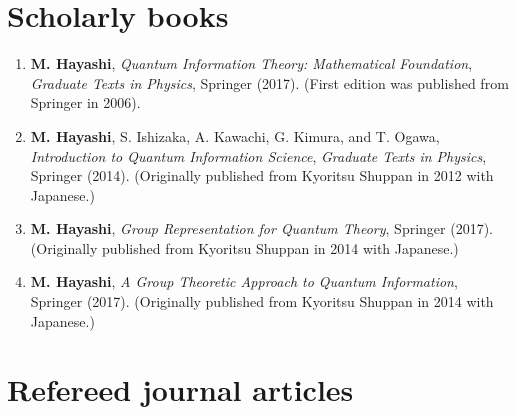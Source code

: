 \documentclass[a4paper,12pt,oneside]{article}
\begin{document}
\section{Scholarly books}
\begin{enumerate}

\item 
\textbf{M. Hayashi},
{\em Quantum Information Theory: Mathematical Foundation}, 
{\em Graduate Texts in Physics}, Springer (2017).
(First edition was published from Springer in 2006).

\item 
\textbf{M. Hayashi}, S. Ishizaka, A. Kawachi, G. Kimura, and T. Ogawa, 
{\em Introduction to Quantum Information Science}, 
{\em Graduate Texts in Physics}, Springer (2014).
(Originally published from Kyoritsu Shuppan in 2012 with Japanese.)
 
\item 
\textbf{M. Hayashi},
{\em Group Representation for Quantum Theory}, Springer (2017). 
(Originally published from Kyoritsu Shuppan in 2014 with Japanese.)

 
\item 
\textbf{M. Hayashi},
{\em A Group Theoretic Approach to Quantum Information}, 
Springer (2017). 
(Originally published from Kyoritsu Shuppan in 2014 with Japanese.)

\end{enumerate}

\section{Refereed journal articles}
\end{document}
